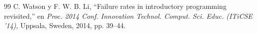 \documentclass[letterpaper, 10 pt, conference]{ieeeconf}
\begin{document}
\begin{thebibliography}{99}
 C. Watson y F. W. B. Li, “Failure rates in introductory programming revisited,” en \textit{Proc. 2014 Conf. Innovation Technol. Comput. Sci. Educ. (ITiCSE '14)}, Uppsala, Sweden, 2014, pp. 39–44.












\end{thebibliography}
\end{document}
